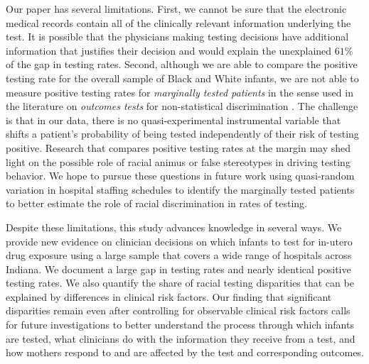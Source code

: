 Our paper has several limitations. First, we cannot be sure that the electronic medical records contain all of the clinically relevant information underlying the test. It is possible that the physicians making testing decisions have additional information that justifies their decision and would explain the unexplained $61\%$ of the gap in testing rates. Second, although we are able to compare the positive testing rate for the overall sample of Black and White infants,  we are not able to measure positive testing rates for \textit{marginally tested patients} in the sense used in the literature on \textit{outcomes tests} for non-statistical discrimination \citep{ayres2002outcome, knowles2001racial, arnold2018racial}. The challenge is that in our data, there is no quasi-experimental instrumental variable that shifts a patient's probability of being tested independently of their risk of testing positive. Research that compares positive testing rates at the margin may shed light on the possible role of racial animus or false stereotypes in driving testing behavior. We hope to pursue these questions in future work using quasi-random variation in hospital staffing schedules to identify the marginally tested patients to better estimate the role of racial discrimination in rates of testing.

Despite these limitations, this study advances knowledge in several ways. We provide new evidence on clinician decisions on which infants to test for in-utero drug exposure using a large sample that covers a wide range of hospitals across Indiana. We document a large gap in testing rates and nearly identical positive testing rates. We also quantify the share of racial testing disparities that can be explained by differences in clinical risk factors. Our finding that significant disparities remain even after controlling for observable clinical risk factors calls for future investigations to better understand the process through which infants are tested, what clinicians do with the information they receive from a test, and how mothers respond to and are affected by the test and corresponding outcomes.


